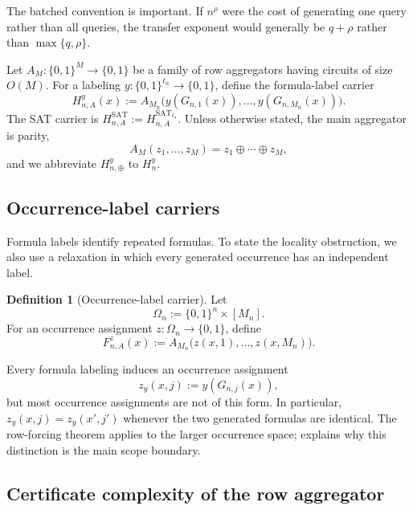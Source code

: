 \documentclass[11pt]{article}
\theoremstyle{definition}
\newtheorem{definition}[theorem]{Definition}
\newcommand{\bits}{\{0,1\}}
\newcommand{\SAT}{\mathrm{SAT}}
\begin{document}
The batched convention is important. If $n^\rho$ were the cost of generating one query rather than all queries, the transfer exponent would generally be $q+\rho$ rather than $\max\{q,\rho\}$.

Let $A_M:\bits^M\to\bits$ be a family of row aggregators having circuits of size $O(M)$. For a labeling $y:\bits^{\ell_n}\to\bits$, define the formula-label carrier
\begin{equation}\label{eq:formula-carrier}
  H_{n,A}^y(x)
  :=A_{M_n}\bigl(y(G_{n,1}(x)),\ldots,y(G_{n,M_n}(x))\bigr).
\end{equation}
The SAT carrier is $H_{n,A}^{\SAT}:=H_{n,A}^{\SAT_{\ell_n}}$. Unless otherwise stated, the main aggregator is parity,
\[
  A_M(z_1,\ldots,z_M)=z_1\oplus\cdots\oplus z_M,
\]
and we abbreviate $H_{n,\oplus}^y$ to $H_n^y$.

\subsection{Occurrence-label carriers}

Formula labels identify repeated formulas. To state the locality obstruction, we also use a relaxation in which every generated occurrence has an independent label.

\begin{definition}[Occurrence-label carrier]\label{def:occurrence-carrier}
Let
\[
  \Omega_n:=\bits^n\times[M_n].
\]
For an occurrence assignment $z:\Omega_n\to\bits$, define
\begin{equation}\label{eq:occurrence-carrier}
  F_{n,A}^z(x):=A_{M_n}\bigl(z(x,1),\ldots,z(x,M_n)\bigr).
\end{equation}
\end{definition}

Every formula labeling induces an occurrence assignment
\begin{equation}\label{eq:realization-map}
  z_y(x,j):=y(G_{n,j}(x)),
\end{equation}
but most occurrence assignments are not of this form. In particular, $z_y(x,j)=z_y(x',j')$ whenever the two generated formulas are identical. The row-forcing theorem applies to the larger occurrence space;  explains why this distinction is the main scope boundary.

\subsection{Certificate complexity of the row aggregator}
\end{document}
